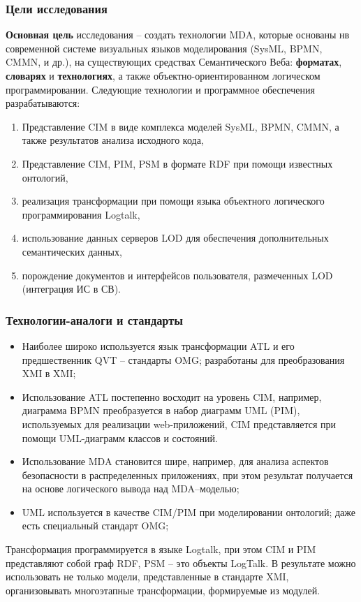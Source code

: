 \documentclass[10pt]{beamer}
\begin{document}
\begin{frame} \frametitle{Цели исследования} \textbf{Основная цель} исследования -- создать технологии MDA, которые основаны нв современной системе визуальных языков моделирования (SysML, BPMN, CMMN, и др.), на существующих средствах Семантического Веба: \textbf{форматах}, \textbf{словарях} и \textbf{технологиях}, а также объектно-ориентированном логическом программировании. Следующие технологии и программное обеспечения разрабатываются: \begin{enumerate} \item Представление CIM в виде комплекса моделей SysML, BPMN, CMMN, а также результатов анализа исходного кода, \item Представление CIM, PIM, PSM в формате RDF при помощи известных онтологий, \item реализация трансформации при помощи языка объектного логического программирования Logtalk, \item использование данных серверов LOD для обеспечения дополнительных семантических данных, \item порождение документов и интерфейсов пользователя, размеченных LOD (интеграция ИС в СВ). \end{enumerate} \end{frame} \begin{frame} \frametitle{Технологии-аналоги и стандарты} \begin{itemize} \item Наиболее широко используется язык трансформации ATL и его предшественник QVT -- стандарты OMG; разработаны для преобразования XMI в XMI; \item Использование ATL постепенно восходит на уровень CIM, например, диаграмма BPMN преобразуется в набор диаграмм UML (PIM), используемых для реализации web-приложений, CIM представляется при помощи UML-диаграмм классов и состояний. \item Использование MDA становится шире, например, для анализа аспектов безопасности в распределенных приложениях, при этом результат получается на основе логического вывода над MDA--моделью;
  \item UML используется в качестве CIM/PIM при моделировании онтологий; даже есть специальный стандарт OMG; %
  \end{itemize}

  Трансформация программируется в языке Logtalk, при этом CIM и PIM представляют собой граф RDF, PSM -- это объекты LogTalk. В результате можно использовать не только модели, представленные в стандарте XMI, организовывать многоэтапные трансформации, формируемые из модулей. \end{frame}
\end{document}
